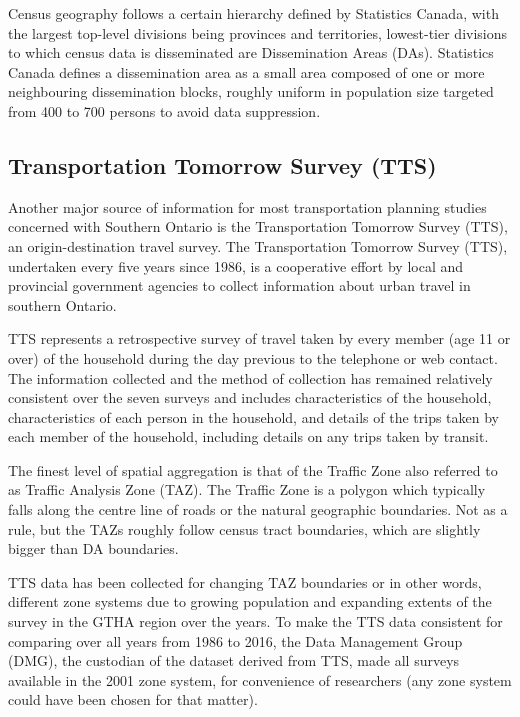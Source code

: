 Census geography follows a certain hierarchy defined by Statistics Canada, with the largest top-level divisions being provinces and territories, lowest-tier divisions to which census data is disseminated are Dissemination Areas (DAs)\cite{StatisticsCanada2018}.
Statistics Canada defines a dissemination area as a small area composed of one or more neighbouring dissemination blocks, roughly uniform in population size targeted from 400 to 700 persons to avoid data suppression\cite{StatisticsCanada2015}.

\subsection{Transportation Tomorrow Survey (TTS)} \label{subsec:tts_description}

Another major source of information for most transportation planning studies concerned with Southern Ontario is the Transportation Tomorrow Survey (TTS)\cite{DataManagementGroup2014}, an origin-destination travel survey.
The Transportation Tomorrow Survey (TTS), undertaken every five years since 1986, is a cooperative effort by local and provincial government agencies to collect information about urban travel in southern Ontario.

TTS represents a retrospective survey of travel taken by every member (age 11 or over) of the household during the day previous to the telephone or web contact.
The information collected and the method of collection has remained relatively consistent over the seven surveys and includes characteristics of the household, characteristics of each person in the household, and details of the trips taken by each member of the household, including details on any trips taken by transit\cite{Ashby2018}.

The finest level of spatial aggregation is that of the Traffic Zone also referred to as Traffic Analysis Zone (TAZ).
The Traffic Zone is a polygon which typically falls along the centre line of roads or the natural geographic boundaries\cite{DataManagementGroup2019}.
Not as a rule, but the TAZs roughly follow census tract boundaries, which are slightly bigger than DA boundaries.

TTS data has been collected for changing TAZ boundaries or in other words, different zone systems due to growing population and expanding extents of the survey in the GTHA region over the years.
To make the TTS data consistent for comparing over all years from 1986 to 2016, the Data Management Group (DMG), the custodian of the dataset derived from TTS, made all surveys available in the 2001 zone system, for convenience of researchers (any zone system could have been chosen for that matter).

